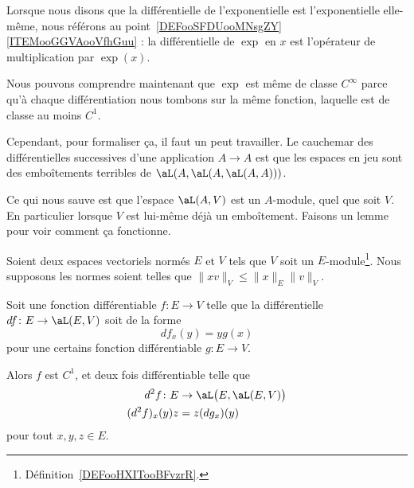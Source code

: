 \begin{normaltext}
    Lorsque nous disons que la différentielle de l'exponentielle est l'exponentielle elle-même, nous référons au point~\ref{DEFooSFDUooMNsgZY}\ref{ITEMooGGVAooVfhGuu} : la différentielle de \( \exp\) en \( x\) est l'opérateur de multiplication par \( \exp(x)\).

    Nous pouvons comprendre maintenant que \( \exp\) est même de classe \(  C^{\infty}\) parce qu'à chaque différentiation nous tombons sur la même fonction, laquelle est de classe au moins \( C^1\).

    Cependant, pour formaliser ça, il faut un peut travailler. Le cauchemar des différentielles successives d'une application \( A\to A\) est que les espaces en jeu sont des emboîtements terribles de \( \aL(A,\aL(A,\aL(A,A)))\).

    Ce qui nous sauve est que l'espace \( \aL(A,V)\) est un \( A\)-module, quel que soit \( V\). En particulier lorsque \( V\) est lui-même déjà un emboîtement. Faisons un lemme pour voir comment ça fonctionne.
\end{normaltext}

\begin{lemma}
    Soient deux espaces vectoriels normés \( E\) et \( V\) tels que \( V\) soit un \( E\)-module\footnote{Définition~\ref{DEFooHXITooBFvzrR}.}. Nous supposons les normes soient telles que \( \| xv \|_{V}\leq \| x \|_E\| v \|_V\).

    Soit une fonction différentiable \( f\colon E\to V\) telle que la différentielle \( df\colon E\to \aL(E,V)\) soit de la forme
    \begin{equation}
        df_x(y)=yg(x)
    \end{equation}
    pour une certains fonction différentiable \( g\colon E\to V\).

    Alors \( f\) est \( C^1\), et deux fois différentiable telle que
    \begin{equation}
        \begin{aligned}
            d^2f\colon E&\to \aL\big( E,\aL(E,V) \big) \\
            (d^2f)_x(y)z&=z(dg_x)(y)
        \end{aligned}
    \end{equation}
    pour tout \( x,y,z\in E\).
\end{lemma}

